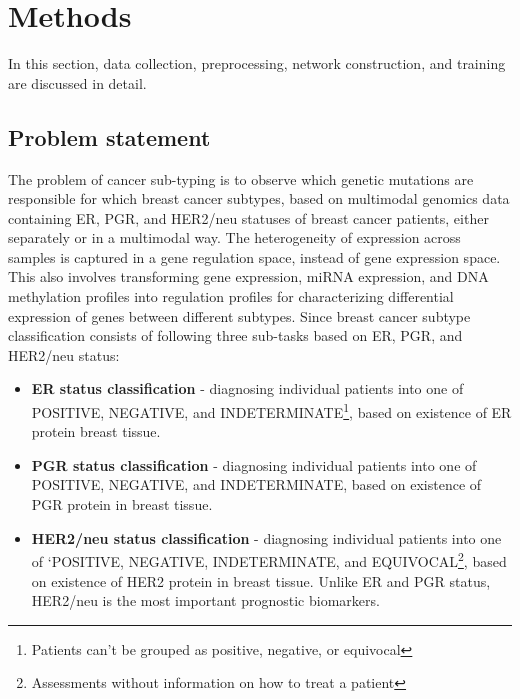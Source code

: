 \section{Methods}\label{chapter_4:mm}
In this section, data collection, preprocessing, network construction, and training are discussed in detail. 

\subsection{Problem statement}
The problem of cancer sub-typing is to observe which genetic mutations are responsible for which breast cancer subtypes, based on multimodal genomics data containing ER, PGR, and HER2/neu statuses of breast cancer patients, either separately or in a multimodal way. 
The heterogeneity of expression across samples is captured in a gene regulation space, instead of gene expression space. This also involves transforming gene expression, miRNA expression, and DNA methylation profiles into regulation profiles for characterizing differential expression of genes between different subtypes. Since breast cancer subtype classification consists of following three sub-tasks based on ER, PGR, and HER2/neu status: %

\begin{itemize}[noitemsep]
    \item \textbf{ER status classification} - diagnosing individual patients into one of POSITIVE, NEGATIVE, and INDETERMINATE\footnote{Patients can't be grouped as positive, negative, or equivocal}, based on existence of ER protein breast tissue. 
    \item \textbf{PGR status classification} - diagnosing individual patients into one of POSITIVE, NEGATIVE, and INDETERMINATE, based on existence of PGR protein in breast tissue. 
    \item \textbf{HER2/neu status classification} - diagnosing individual patients into one of `POSITIVE, NEGATIVE, INDETERMINATE, and EQUIVOCAL\footnote{Assessments without information on how to treat a patient}, based on existence of HER2 protein in breast tissue. Unlike ER and PGR status, HER2/neu is the most important prognostic biomarkers. 
\end{itemize}

